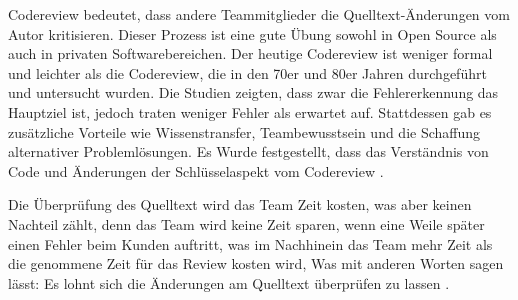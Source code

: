 
Codereview bedeutet, dass andere Teammitglieder die Quelltext-Änderungen vom Autor kritisieren. Dieser Prozess ist eine gute Übung sowohl in Open Source als auch in privaten Softwarebereichen. Der heutige Codereview ist weniger formal und leichter als die Codereview, die in den 70er und 80er Jahren durchgeführt und untersucht wurden. Die Studien zeigten, dass zwar die Fehlererkennung das Hauptziel ist, jedoch traten weniger Fehler als erwartet auf. Stattdessen gab es zusätzliche Vorteile wie Wissenstransfer, Teambewusstsein und die Schaffung alternativer Problemlösungen. Es Wurde festgestellt, dass das Verständnis von Code und Änderungen der Schlüsselaspekt vom Codereview \cite{bacchelli2013expectations}.

Die Überprüfung des Quelltext wird das Team Zeit kosten, was aber keinen Nachteil zählt, denn das Team wird keine Zeit sparen, wenn eine Weile später einen Fehler beim Kunden auftritt, was im Nachhinein das Team mehr Zeit als die genommene Zeit für das Review kosten wird, Was mit anderen Worten sagen lässt: Es lohnt sich die Änderungen am Quelltext überprüfen zu lassen \cite{Bjoern}.

